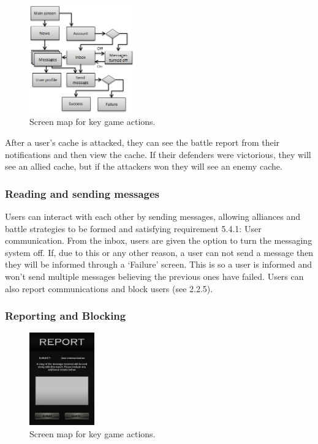 \begin{figure}
	\vspace{-20pt}
	\begin{center}
	\includegraphics[width=0.4\textwidth]{images/sending_messages}
	\caption{Screen map for key game actions.}
	\label{sending_messages}
	\end{center}
\end{figure}

After a user’s cache is attacked, they can see the battle report from their notifications and then view the cache. If their defenders were victorious, they will see an allied cache, but if the attackers won they will see an enemy cache.

\subsubsection{Reading and sending messages}

Users can interact with each other by sending messages, allowing alliances and battle strategies to be formed and satisfying requirement 5.4.1: User communication. From the inbox, users are given the option to turn the messaging system off. If, due to this or any other reason, a user can not send a message then they will be informed through a ‘Failure’ screen. This is so a user is informed and won’t send multiple messages believing the previous ones have failed. Users can also report communications and block users (see 2.2.5).

\subsubsection{Reporting and Blocking}
\begin{figure}
	\vspace{-20pt}
	\begin{center}
	\includegraphics[width=0.25\textwidth]{images/report_mockup}
	\caption{Screen map for key game actions.}
	\label{report_mockup}
	\end{center}
	\vspace{-130pt}
\end{figure}

